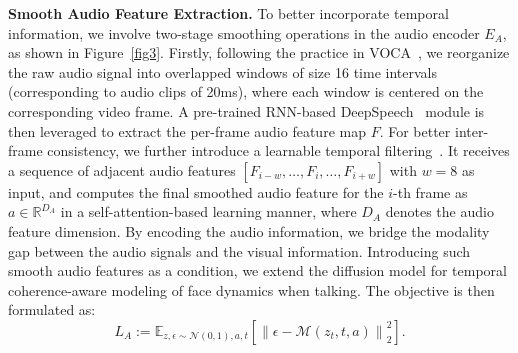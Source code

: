 \documentclass[10pt,twocolumn,letterpaper]{article}
\begin{document}
\vspace{1mm}
\textbf{Smooth Audio Feature Extraction.}
To better incorporate temporal information, we involve two-stage smoothing operations in the audio encoder $E_A$, as shown in Figure~\ref{fig3}. Firstly, following the practice in VOCA~\cite{cudeiro2019capture}, we reorganize the raw audio signal into overlapped windows of size 16 time intervals (corresponding to audio clips of 20ms), where each window is centered on the corresponding video frame. A pre-trained RNN-based DeepSpeech~\cite{hannun2014deep} module is then leveraged to extract the per-frame audio feature map $F$. For better inter-frame consistency, we further introduce a learnable temporal filtering~\cite{thies2020neural}. It receives a sequence of adjacent audio features $[F_{i-w}, \dots, F_i, \dots, F_{i+w}]$ with $w=8$ as input, and computes the final smoothed audio feature for the $i$-th frame as $a \in \mathbb{R}^{D_A}$ in a self-attention-based learning manner, where $D_A$ denotes the audio feature dimension.
By encoding the audio information, we bridge the modality gap between the audio signals and the visual information. Introducing such smooth audio features as a condition, we extend the diffusion model for temporal coherence-aware modeling of face dynamics when talking. The objective is then formulated as:
\begin{equation}
L_A:=\mathbb{E}_{z, \epsilon \sim \mathcal{N}(0,1), a, t}\left[\left\|\epsilon-\mathcal{M}\left(z_{t}, t, a\right)\right\|_{2}^{2}\right].
\label{eq:important}
\end{equation}
\end{document}

